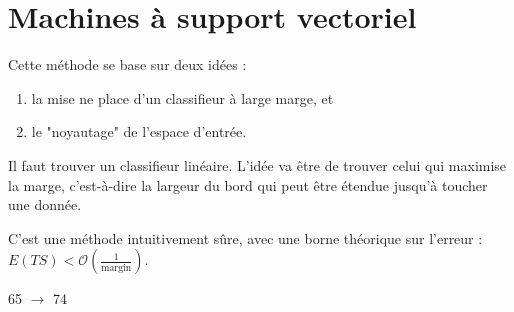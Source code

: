 \chapter{Machines à support vectoriel}

Cette méthode se base sur deux idées :

\begin{enumerate}
	\item la mise ne place d'un classifieur à large marge, et
	\item le "noyautage" de l'espace d'entrée.
\end{enumerate}

Il faut trouver un classifieur linéaire. L'idée va être de trouver celui qui maximise la marge, c'est-à-dire la largeur du bord qui peut être étendue jusqu'à toucher une donnée.


C'est une méthode intuitivement sûre, avec une borne théorique sur l'erreur : $E(TS) < \mathcal{O}(\frac{1}{\text{margin}})$.

65 $\rightarrow$ 74
